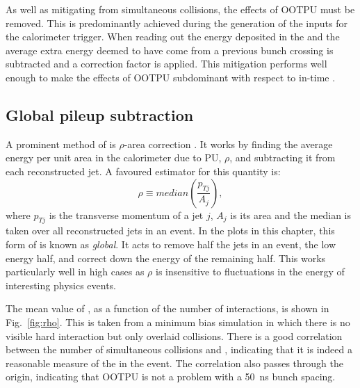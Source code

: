 As well as mitigating \PU from simultaneous collisions, the effects of
\ac{OOTPU} must be removed. This is predominantly achieved during the
generation of the \TT inputs for the calorimeter trigger. When reading
out the energy deposited in the \ECAL and \HCAL the average extra
energy deemed to have come from a previous bunch crossing is
subtracted and a correction factor is applied. This mitigation
performs well enough to make the effects of \ac{OOTPU} subdominant
with respect to in-time \PU.

\subsection{Global pileup subtraction}

A prominent method of \PUS is $\rho$-area correction
\cite{Cacciari:2007fd,Cacciari:2008gn}. It works by finding the
average energy per unit area in the calorimeter due to PU, $\rho$, and
subtracting it from each reconstructed jet. A favoured estimator for this
quantity is:
\begin{equation}
\rho\equiv median(\frac{p_{Tj}}{A_j}),
\end{equation}
where $p_{Tj}$ is the transverse momentum of a jet $j$, $A_j$ is its
area and the median is taken over all reconstructed jets in an event.
In the plots in this chapter, this form of \PUS is known as \emph{global}. It
acts to remove half the jets in an event, the low energy half, and
correct down the energy of the remaining half. This works
particularly well in high \PU cases as $\rho$ is insensitive to
fluctuations in the energy of interesting physics events. 

The mean value of \rho, as a function of the number of interactions,
is shown in Fig.~\ref{fig:rho}. This is taken from a minimum bias \MC
simulation in which there is no visible hard interaction but only
overlaid \PU collisions. There is a good correlation between the
number of simultaneous collisions and \rho, indicating that it is
indeed a reasonable measure of the \PU in the event. The correlation
also passes through the origin, indicating that \ac{OOTPU} is not a
problem with a 50~ns bunch spacing.

